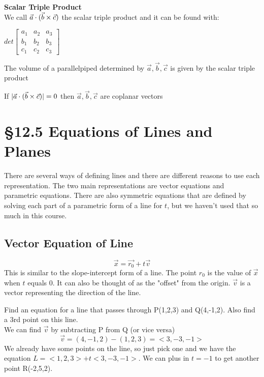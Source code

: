 \documentclass[12 pt]{article}
\begin{document}
		\begin{def*}\textbf{Scalar Triple Product}\\
			We call $\vec{a}\cdot (\vec{b}\times\vec{c})$ the scalar triple product and it can be found with:\\
			\begin{center}$det\begin{bmatrix}
				a_1 & a_2 & a_3 \\
				b_1 & b_2 & b_3 \\
				c_1 & c_2 & c_3
			\end{bmatrix}$\end{center}
			The volume of a parallelpiped determined by $\vec{a},\vec{b},\vec{c}$ is given by the scalar triple product
		\end{def*}

		\begin{remark}
			If $\lvert \vec{a}\cdot (\vec{b}\times\vec{c})\rvert = 0$ then $\vec{a},\vec{b},\vec{c}$ 	are coplanar vectors
		\end{remark}

	\section{\S 12.5 Equations of Lines and Planes}
		There are several ways of defining lines and there are different reasons to use each representation. The two main representations are vector equations and parametric equations. There are also symmetric equations that are defined by solving each part of a parametric form of a line for $t$, but we haven't used that so much in this course.

		\subsection{Vector Equation of Line}
		$$\vec{x}=\vec{r_0}+t\vec{v}$$
		This is similar to the slope-intercept form of a line. The point $r_0$ is the value of $\vec{x}$ when $t$ equals 0. It can also be thought of as the "offset" from the origin. $\vec{v}$ is a vector representing the direction of the line.
		\begin{exmp*}
			Find an equation for a line that passes through P(1,2,3) and Q(4,-1,2). Also find a 3rd point on this line.\\
			We can find $\vec{v}$ by subtracting P from Q (or vice versa)
			$$\vec{v}=(4,-1,2)-(1,2,3)=<3,-3,-1>$$
			We already have some points on the line, so just pick one and we have the equation $L=<1,2,3>+t<3,-3,-1>$. We can plus in $t=-1$ to get another point R(-2,5,2).
		\end{exmp*}
\end{document}
